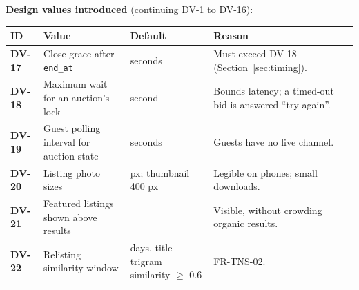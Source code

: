 \documentclass[11pt,a4paper]{article}
\newenvironment{dtable}[1]{\small\begin{longtable}{#1}}{\end{longtable}}
\begin{document}
\textbf{Design values introduced} (continuing DV-1 to DV-16):
\begin{dtable}{@{}>{\bfseries}p{1.3cm}>{\raggedright\arraybackslash}p{6.0cm}>{\raggedright\arraybackslash}p{2.6cm}>{\raggedright\arraybackslash}p{5.3cm}@{}}
\toprule
\textnormal{\textbf{ID}} & \textbf{Value} & \textbf{Default} & \textbf{Reason} \\ \midrule \endhead
DV-17 & Close grace after \texttt{end\_at} & 2 seconds & Must exceed DV-18 (Section~\ref{sec:timing}). \\
DV-18 & Maximum wait for an auction's lock & 1 second & Bounds latency; a timed-out bid is answered ``try again''. \\
DV-19 & Guest polling interval for auction state & 5 seconds & Guests have no live channel. \\
DV-20 & Listing photo sizes & 1600 px; thumbnail 400 px & Legible on phones; small downloads. \\
DV-21 & Featured listings shown above results & 3 & Visible, without crowding organic results. \\
DV-22 & Relisting similarity window & 7 days, title trigram similarity $\ge$ 0.6 & FR-TNS-02. \\
\bottomrule
\end{dtable}
\end{document}
